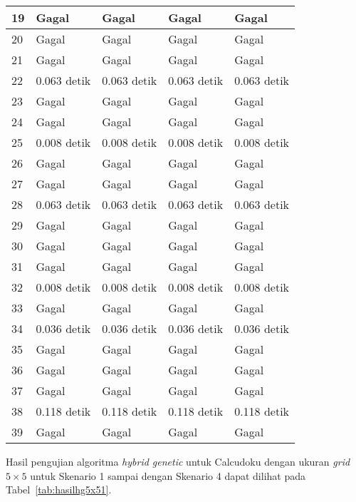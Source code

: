 \begin{table}
\begin{tabular}{| l | l | l | l | l |}
\hline
19 & Gagal & Gagal & Gagal & Gagal \\
\hline
20 & Gagal & Gagal & Gagal & Gagal \\
\hline
21 & Gagal & Gagal & Gagal & Gagal \\
\hline
22 & 0.063 detik & 0.063 detik & 0.063 detik & 0.063 detik \\
\hline
23 & Gagal & Gagal & Gagal & Gagal \\
\hline
24 & Gagal & Gagal & Gagal & Gagal \\
\hline
25 & 0.008 detik & 0.008 detik & 0.008 detik & 0.008 detik \\
\hline
26 & Gagal & Gagal & Gagal & Gagal \\
\hline
27 & Gagal & Gagal & Gagal & Gagal \\
\hline
28 & 0.063 detik & 0.063 detik & 0.063 detik & 0.063 detik \\
\hline
29 & Gagal & Gagal & Gagal & Gagal \\
\hline
30 & Gagal & Gagal & Gagal & Gagal \\
\hline
31 & Gagal & Gagal & Gagal & Gagal \\
\hline
32 & 0.008 detik & 0.008 detik & 0.008 detik & 0.008 detik \\
\hline
33 & Gagal & Gagal & Gagal & Gagal \\
\hline
34 & 0.036 detik & 0.036 detik & 0.036 detik & 0.036 detik \\
\hline
35 & Gagal & Gagal & Gagal & Gagal \\
\hline
36 & Gagal & Gagal & Gagal & Gagal \\
\hline
37 & Gagal & Gagal & Gagal & Gagal \\
\hline
38 & 0.118 detik & 0.118 detik & 0.118 detik & 0.118 detik \\
\hline
39 & Gagal & Gagal & Gagal & Gagal \\
\hline
\end{tabular}
\label{tab:hasilhg4x44}
\end{table}

Hasil pengujian algoritma \textit{hybrid genetic} untuk Calcudoku dengan ukuran \textit{grid} \begin{math}5 \times 5\end{math} untuk Skenario 1 sampai dengan Skenario 4 dapat dilihat pada Tabel~\ref{tab:hasilhg5x51}.

